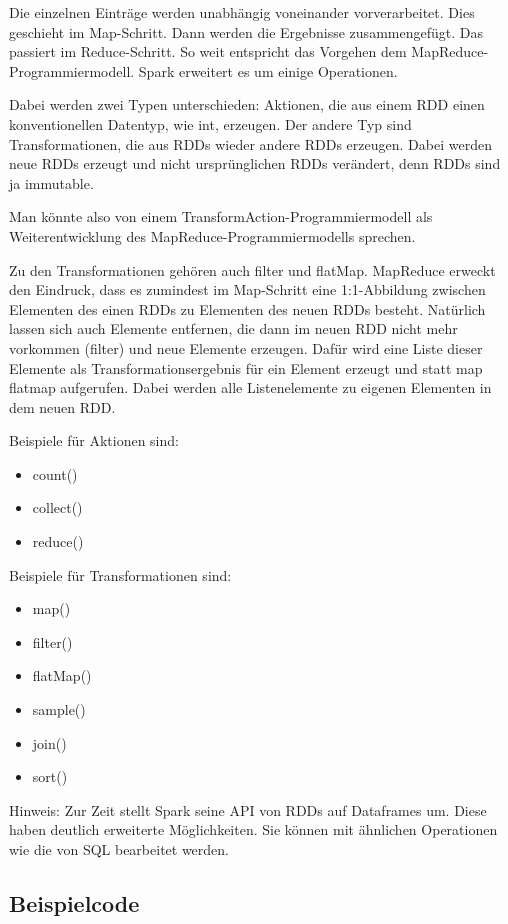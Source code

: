 \documentclass[letterpaper]{article}
\begin{document}
Die einzelnen Einträge werden unabhängig voneinander vorverarbeitet.
Dies geschieht im Map-Schritt. Dann werden die Ergebnisse
zusammengefügt. Das passiert im Reduce-Schritt. So weit entspricht das
Vorgehen dem MapReduce-Programmiermodell. Spark erweitert es um einige
Operationen.

Dabei werden zwei Typen unterschieden: Aktionen, die aus einem RDD einen
konventionellen Datentyp, wie int, erzeugen. Der andere Typ sind
Transformationen, die aus RDDs wieder andere RDDs erzeugen. Dabei
werden neue RDDs erzeugt und nicht ursprünglichen RDDs verändert, denn
RDDs sind ja immutable.

Man könnte also von einem TransformAction-Programmiermodell als
Weiterentwicklung des MapReduce-Programmiermodells sprechen.

Zu den Transformationen gehören auch filter und flatMap. MapReduce
erweckt den Eindruck, dass es zumindest im Map-Schritt eine
1:1-Abbildung zwischen Elementen des einen RDDs zu Elementen des neuen
RDDs besteht. Natürlich lassen sich auch Elemente entfernen, die dann
im neuen RDD nicht mehr vorkommen (filter) und neue Elemente erzeugen. Dafür
wird eine Liste dieser Elemente als Transformationsergebnis für ein
Element erzeugt und statt map flatmap aufgerufen. Dabei werden alle
Listenelemente zu eigenen Elementen in dem neuen RDD.

Beispiele für Aktionen sind:

\begin{itemize}
\item count()
\item collect()
\item reduce()
\end{itemize}
Beispiele für Transformationen sind:

\begin{itemize}
\item map()
\item filter()
\item flatMap()
\item sample()
\item join()
\item sort()
\end{itemize}
Hinweis: Zur Zeit stellt Spark seine API von RDDs auf Dataframes um.
Diese haben deutlich erweiterte Möglichkeiten. Sie können mit ähnlichen
Operationen wie die von SQL bearbeitet werden.


\subsection{Beispielcode}
\end{document}
